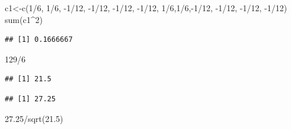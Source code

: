 \documentclass[
]{book}
\newenvironment{Shaded}{\begin{snugshade}}{\end{snugshade}}
\newcommand{\DecValTok}[1]{\textcolor[rgb]{0.00,0.00,0.81}{#1}}
\newcommand{\FloatTok}[1]{\textcolor[rgb]{0.00,0.00,0.81}{#1}}
\newcommand{\FunctionTok}[1]{\textcolor[rgb]{0.00,0.00,0.00}{#1}}
\newcommand{\NormalTok}[1]{#1}
\newcommand{\OtherTok}[1]{\textcolor[rgb]{0.56,0.35,0.01}{#1}}
\newcommand{\SpecialCharTok}[1]{\textcolor[rgb]{0.00,0.00,0.00}{#1}}
\begin{document}
\begin{Shaded}
\begin{Highlighting}[]
\NormalTok{ c1}\OtherTok{\textless{}{-}}\FunctionTok{c}\NormalTok{(}\DecValTok{1}\SpecialCharTok{/}\DecValTok{6}\NormalTok{, }\DecValTok{1}\SpecialCharTok{/}\DecValTok{6}\NormalTok{, }\SpecialCharTok{{-}}\DecValTok{1}\SpecialCharTok{/}\DecValTok{12}\NormalTok{, }\SpecialCharTok{{-}}\DecValTok{1}\SpecialCharTok{/}\DecValTok{12}\NormalTok{, }\SpecialCharTok{{-}}\DecValTok{1}\SpecialCharTok{/}\DecValTok{12}\NormalTok{, }\SpecialCharTok{{-}}\DecValTok{1}\SpecialCharTok{/}\DecValTok{12}\NormalTok{, }\DecValTok{1}\SpecialCharTok{/}\DecValTok{6}\NormalTok{,}\DecValTok{1}\SpecialCharTok{/}\DecValTok{6}\NormalTok{,}\SpecialCharTok{{-}}\DecValTok{1}\SpecialCharTok{/}\DecValTok{12}\NormalTok{, }\SpecialCharTok{{-}}\DecValTok{1}\SpecialCharTok{/}\DecValTok{12}\NormalTok{, }\SpecialCharTok{{-}}\DecValTok{1}\SpecialCharTok{/}\DecValTok{12}\NormalTok{, }\SpecialCharTok{{-}}\DecValTok{1}\SpecialCharTok{/}\DecValTok{12}\NormalTok{)}
\FunctionTok{sum}\NormalTok{(c1}\SpecialCharTok{\^{}}\DecValTok{2}\NormalTok{)}
\end{Highlighting}
\end{Shaded}

\begin{verbatim}
## [1] 0.1666667
\end{verbatim}

\begin{Shaded}
\begin{Highlighting}[]
\DecValTok{129}\SpecialCharTok{/}\DecValTok{6}
\end{Highlighting}
\end{Shaded}

\begin{verbatim}
## [1] 21.5
\end{verbatim}

\begin{Shaded}
\end{Shaded}

\begin{verbatim}
## [1] 27.25
\end{verbatim}

\begin{Shaded}
\begin{Highlighting}[]
\FloatTok{27.25}\SpecialCharTok{/}\FunctionTok{sqrt}\NormalTok{(}\FloatTok{21.5}\NormalTok{)}
\end{Highlighting}
\end{Shaded}
\end{document}
